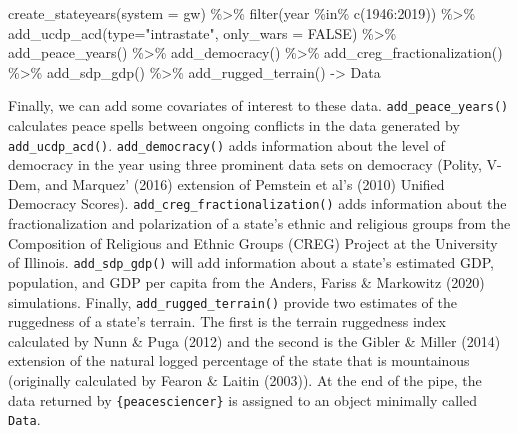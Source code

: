 \documentclass[
  11pt,
]{article}
\newenvironment{Shaded}{\begin{snugshade}}{\end{snugshade}}
\newcommand{\AttributeTok}[1]{\textcolor[rgb]{0.77,0.63,0.00}{#1}}
\newcommand{\ConstantTok}[1]{\textcolor[rgb]{0.00,0.00,0.00}{#1}}
\newcommand{\DecValTok}[1]{\textcolor[rgb]{0.00,0.00,0.81}{#1}}
\newcommand{\FunctionTok}[1]{\textcolor[rgb]{0.00,0.00,0.00}{#1}}
\newcommand{\NormalTok}[1]{#1}
\newcommand{\OtherTok}[1]{\textcolor[rgb]{0.56,0.35,0.01}{#1}}
\newcommand{\SpecialCharTok}[1]{\textcolor[rgb]{0.00,0.00,0.00}{#1}}
\newcommand{\StringTok}[1]{\textcolor[rgb]{0.31,0.60,0.02}{#1}}
\begin{document}
\begin{Shaded}
\begin{Highlighting}[]
\FunctionTok{create\_stateyears}\NormalTok{(}\AttributeTok{system =} \StringTok{\textquotesingle{}gw\textquotesingle{}}\NormalTok{) }\SpecialCharTok{\%\textgreater{}\%}
  \FunctionTok{filter}\NormalTok{(year }\SpecialCharTok{\%in\%} \FunctionTok{c}\NormalTok{(}\DecValTok{1946}\SpecialCharTok{:}\DecValTok{2019}\NormalTok{)) }\SpecialCharTok{\%\textgreater{}\%}
  \FunctionTok{add\_ucdp\_acd}\NormalTok{(}\AttributeTok{type=}\StringTok{"intrastate"}\NormalTok{, }\AttributeTok{only\_wars =} \ConstantTok{FALSE}\NormalTok{) }\SpecialCharTok{\%\textgreater{}\%}
  \FunctionTok{add\_peace\_years}\NormalTok{() }\SpecialCharTok{\%\textgreater{}\%}
  \FunctionTok{add\_democracy}\NormalTok{() }\SpecialCharTok{\%\textgreater{}\%}
  \FunctionTok{add\_creg\_fractionalization}\NormalTok{() }\SpecialCharTok{\%\textgreater{}\%}
  \FunctionTok{add\_sdp\_gdp}\NormalTok{() }\SpecialCharTok{\%\textgreater{}\%}
  \FunctionTok{add\_rugged\_terrain}\NormalTok{() }\OtherTok{{-}\textgreater{}}\NormalTok{ Data}
\end{Highlighting}
\end{Shaded}

Finally, we can add some covariates of interest to these data. \texttt{add\_peace\_years()} calculates peace spells between ongoing conflicts in the data generated by \texttt{add\_ucdp\_acd()}. \texttt{add\_democracy()} adds information about the level of democracy in the year using three prominent data sets on democracy (Polity, V-Dem, and Marquez' (2016) extension of Pemstein et al's (2010) Unified Democracy Scores). \texttt{add\_creg\_fractionalization()} adds information about the fractionalization and polarization of a state's ethnic and religious groups from the Composition of Religious and Ethnic Groups (CREG) Project at the University of Illinois. \texttt{add\_sdp\_gdp()} will add information about a state's estimated GDP, population, and GDP per capita from the Anders, Fariss \& Markowitz (2020) simulations. Finally, \texttt{add\_rugged\_terrain()} provide two estimates of the ruggedness of a state's terrain. The first is the terrain ruggedness index calculated by Nunn \& Puga (2012) and the second is the Gibler \& Miller (2014) extension of the natural logged percentage of the state that is mountainous (originally calculated by Fearon \& Laitin (2003)). At the end of the pipe, the data returned by \texttt{\{peacesciencer\}} is assigned to an object minimally called \texttt{Data}.
\end{document}
